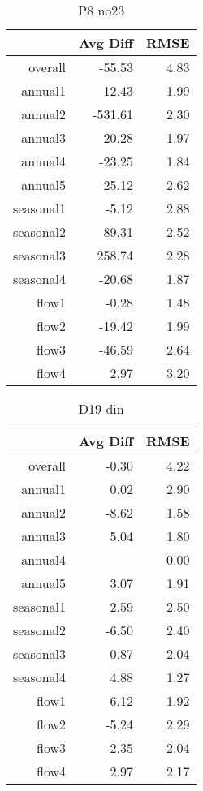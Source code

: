 \begin{table}[H]
\centering
\begin{tabular}{rrr}
  \hline
 & Avg Diff & RMSE \\ 
  \hline
overall & -55.53 & 4.83 \\ 
  annual1 & 12.43 & 1.99 \\ 
  annual2 & -531.61 & 2.30 \\ 
  annual3 & 20.28 & 1.97 \\ 
  annual4 & -23.25 & 1.84 \\ 
  annual5 & -25.12 & 2.62 \\ 
  seasonal1 & -5.12 & 2.88 \\ 
  seasonal2 & 89.31 & 2.52 \\ 
  seasonal3 & 258.74 & 2.28 \\ 
  seasonal4 & -20.68 & 1.87 \\ 
  flow1 & -0.28 & 1.48 \\ 
  flow2 & -19.42 & 1.99 \\ 
  flow3 & -46.59 & 2.64 \\ 
  flow4 & 2.97 & 3.20 \\ 
   \hline
\end{tabular}
\caption{P8 no23} 
\end{table}
\begin{table}[H]
\centering
\begin{tabular}{rrr}
  \hline
 & Avg Diff & RMSE \\ 
  \hline
overall & -0.30 & 4.22 \\ 
  annual1 & 0.02 & 2.90 \\ 
  annual2 & -8.62 & 1.58 \\ 
  annual3 & 5.04 & 1.80 \\ 
  annual4 &  & 0.00 \\ 
  annual5 & 3.07 & 1.91 \\ 
  seasonal1 & 2.59 & 2.50 \\ 
  seasonal2 & -6.50 & 2.40 \\ 
  seasonal3 & 0.87 & 2.04 \\ 
  seasonal4 & 4.88 & 1.27 \\ 
  flow1 & 6.12 & 1.92 \\ 
  flow2 & -5.24 & 2.29 \\ 
  flow3 & -2.35 & 2.04 \\ 
  flow4 & 2.97 & 2.17 \\ 
   \hline
\end{tabular}
\caption{D19 din} 
\end{table}
